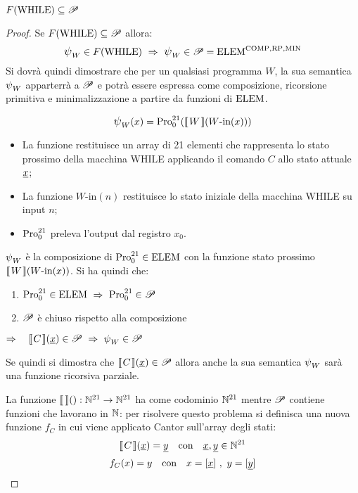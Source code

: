 \begin{theorem}
    $F(\text{WHILE}) \subseteq \mathscr{P}$
\end{theorem}
\begin{proof}
    Se $F(\text{WHILE}) \subseteq \mathscr{P}$ allora:
    $$ \semanticaWHILE_W\in F(\text{WHILE})\ \Rightarrow\ \semanticaWHILE_W
    \in\ricPar = \elem^{\comp,\RP,\MIN}$$
    Si dovrà quindi dimostrare che per un qualsiasi programma $W$, la sua semantica
    $\semanticaWHILE_W$ apparterrà a $\mathscr{P}$ e potrà essere espressa come
    composizione, ricorsione primitiva e minimalizzazione a partire da funzioni di
    $\text{ELEM}$.

    $$ \semanticaWHILE_W(x) = \Pro_0^{21}(\opsemWHILE{W}{W\text{-in}(x)}) $$
    \begin{itemize}
        \item La funzione  restituisce un array di 21
            elementi che rappresenta lo stato prossimo della macchina WHILE applicando
            il comando $C$ allo stato attuale $\text{\underline{$x$}}$;
        \item La funzione $W\text{-in}(n)$ restituisce lo stato iniziale della
            macchina WHILE su input $n$;
        \item $\text{Pro}_0^{21}$ preleva l'output dal registro $x_0$.
    \end{itemize}
    $\semanticaWHILE_W$ è la composizione di $\text{Pro}_0^{21}\in\text{ELEM}$ con la funzione
    stato prossimo $\opsemWHILE{W}{W\text{-in}(x)}$. Si ha quindi che:

    \begin{minipage}{.5\textwidth}
    \begin{enumerate}
        \item $\Pro_0^{21}\in\elem \ \Rightarrow \ \Pro_0^{21}\in\ricPar$
        \item $\mathscr{P}$ è chiuso rispetto alla composizione
    \end{enumerate}
    \end{minipage}
    \begin{minipage}{.4\textwidth}
        $\Rightarrow \quad \opsemWHILE{C}{\sottolinea{x}}\in\ricPar \ \Rightarrow \ 
        \semanticaWHILE_W\in\ricPar$
    \end{minipage}

    Se quindi si dimostra che $\opsemWHILE{C}{\sottolinea{x}}\in\ricPar$ allora anche
    la sua semantica $\semanticaWHILE_W$ sarà una funzione ricorsiva parziale.

    La funzione $\opsemWHILE{}{}:\N^{21}\to\N^{21}$ ha come codominio $\mathbb{N}^{21}$ mentre
    $\mathscr{P}$ contiene funzioni che lavorano in $\mathbb{N}$: per risolvere questo problema
    si definisca una nuova funzione $f_C$ in cui viene applicato Cantor sull'array 
    degli stati:
    $$ \opsemWHILE{C}{\sottolinea{x}} = \sottolinea{y} \quad \text{con }
     \ \ \sottolinea{x},\sottolinea{y}\in\N^{21}$$
    $$ f_C(x)=y \quad \text{con }
     \ \ x=[\text{\underline{$x$}}]\ ,\ y=[\text{\underline{$y$}}]$$
    

\end{proof}
